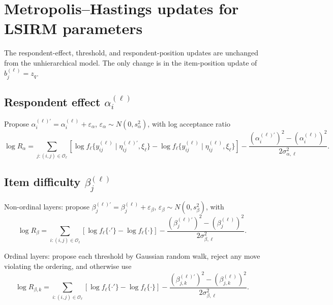 \documentclass[11pt]{article}
\begin{document}
\section{Metropolis--Hastings updates for LSIRM parameters}

The respondent-effect, threshold, and respondent-position updates are
unchanged from the unhierarchical model.  The only change is in the
item-position update of $b_j^{(\ell)}=z_q$.

\subsection{Respondent effect $\alpha_i^{(\ell)}$}

Propose $\alpha_i^{(\ell)\prime}=\alpha_i^{(\ell)}+\varepsilon_\alpha$,
$\varepsilon_\alpha\sim N(0,s_\alpha^2)$, with log acceptance ratio
\begin{equation}
    \log R_\alpha
    =
    \sum_{j:(i,j)\in\mathcal O_\ell}
    \!\left[\log f_\ell\{y_{ij}^{(\ell)}\!\mid\!\eta_{ij}^{(\ell)\prime},\xi_\ell\}
    -\log f_\ell\{y_{ij}^{(\ell)}\!\mid\!\eta_{ij}^{(\ell)},\xi_\ell\}\right]
    -\frac{(\alpha_i^{(\ell)\prime})^2-(\alpha_i^{(\ell)})^2}{2\sigma_{\alpha,\ell}^2}.
    \label{eq:alpha-mh-ratio}
\end{equation}

\subsection{Item difficulty $\beta_j^{(\ell)}$}

Non-ordinal layers: propose
$\beta_j^{(\ell)\prime}=\beta_j^{(\ell)}+\varepsilon_\beta$,
$\varepsilon_\beta\sim N(0,s_\beta^2)$, with
\begin{equation}
    \log R_\beta
    =
    \sum_{i:(i,j)\in\mathcal O_\ell}
    \!\left[\log f_\ell\{\cdot'\}-\log f_\ell\{\cdot\}\right]
    -\frac{(\beta_j^{(\ell)\prime})^2-(\beta_j^{(\ell)})^2}{2\sigma_{\beta,\ell}^2}.
    \label{eq:beta-mh-ratio}
\end{equation}

Ordinal layers: propose each threshold by Gaussian random walk, reject any
move violating the ordering, and otherwise use
\begin{equation}
    \log R_{\beta,k}
    =
    \sum_{i:(i,j)\in\mathcal O_\ell}\!\left[\log f_\ell\{\cdot'\}-\log f_\ell\{\cdot\}\right]
    -\frac{(\beta_{j,k}^{(\ell)\prime})^2-(\beta_{j,k}^{(\ell)})^2}{2\sigma_{\beta,\ell}^2}.
    \label{eq:beta-thr-mh-ratio}
\end{equation}
\end{document}
